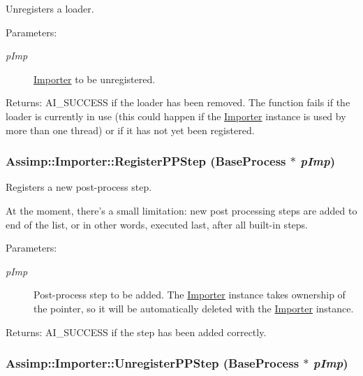Unregisters a loader.

\begin{Desc}
\item[Parameters:]
\begin{description}
\item[{\em pImp}]\hyperlink{class_assimp_1_1_importer}{Importer} to be unregistered. \end{description}
\end{Desc}
\begin{Desc}
\item[Returns:]AI\_\-SUCCESS if the loader has been removed. The function fails if the loader is currently in use (this could happen if the \hyperlink{class_assimp_1_1_importer_2c207299ed05f1db1ad1e6dab005f719}{Importer} instance is used by more than one thread) or if it has not yet been registered. \end{Desc}
\hypertarget{class_assimp_1_1_importer_102650d3648c0e414a1e73bdad9bed35}{
\subsubsection[RegisterPPStep]{ Assimp::Importer::RegisterPPStep (BaseProcess $\ast$ {\em pImp})}}
\label{class_assimp_1_1_importer_102650d3648c0e414a1e73bdad9bed35}


Registers a new post-process step.

At the moment, there's a small limitation: new post processing steps are added to end of the list, or in other words, executed last, after all built-in steps. \begin{Desc}
\item[Parameters:]
\begin{description}
\item[{\em pImp}]Post-process step to be added. The \hyperlink{class_assimp_1_1_importer}{Importer} instance takes ownership of the pointer, so it will be automatically deleted with the \hyperlink{class_assimp_1_1_importer}{Importer} instance. \end{description}
\end{Desc}
\begin{Desc}
\item[Returns:]AI\_\-SUCCESS if the step has been added correctly. \end{Desc}
\hypertarget{class_assimp_1_1_importer_3a683671c7c40638b1103c5d3648d86c}{
\subsubsection[UnregisterPPStep]{ Assimp::Importer::UnregisterPPStep (BaseProcess $\ast$ {\em pImp})}}
\label{class_assimp_1_1_importer_3a683671c7c40638b1103c5d3648d86c}


